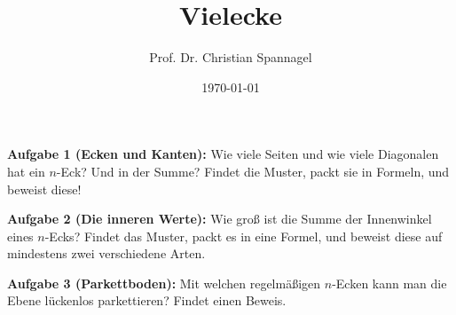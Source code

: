 \documentclass{../cssheet}
\title{Vielecke}
\author{Prof. Dr. Christian Spannagel}
\date{\today}
\begin{document}
\printtitle

\textbf{Aufgabe 1 (Ecken und Kanten):}  Wie viele Seiten und wie viele Diagonalen hat ein $n$-Eck? Und in der Summe? Findet die Muster, packt sie in Formeln, und beweist diese!

\textbf{Aufgabe 2 (Die inneren Werte):} Wie groß ist die Summe der Innenwinkel eines $n$-Ecks? Findet das Muster, packt es in eine Formel, und beweist diese auf mindestens zwei verschiedene Arten.

\textbf{Aufgabe 3 (Parkettboden):} Mit welchen regelmäßigen $n$-Ecken kann man die Ebene lückenlos parkettieren? Findet einen Beweis.

\vspace*{10mm}
\printlicense

\printsocials

\end{document}
